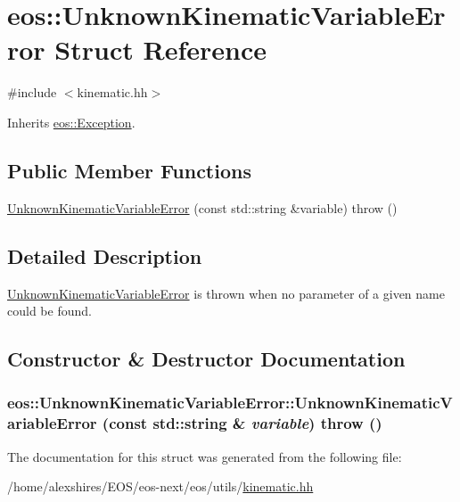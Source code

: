 \hypertarget{structeos_1_1UnknownKinematicVariableError}{
\section{eos::UnknownKinematicVariableError Struct Reference}
\label{structeos_1_1UnknownKinematicVariableError}
}


{\ttfamily \#include $<$kinematic.hh$>$}

Inherits \hyperlink{classeos_1_1Exception}{eos::Exception}.\subsection*{Public Member Functions}
\begin{DoxyCompactItemize}
\item 
\hyperlink{structeos_1_1UnknownKinematicVariableError_a6f06ee64bdae813e463662c63f09d578}{UnknownKinematicVariableError} (const std::string \&variable)  throw ()
\end{DoxyCompactItemize}


\subsection{Detailed Description}
\hyperlink{structeos_1_1UnknownKinematicVariableError}{UnknownKinematicVariableError} is thrown when no parameter of a given name could be found. 

\subsection{Constructor \& Destructor Documentation}
\hypertarget{structeos_1_1UnknownKinematicVariableError_a6f06ee64bdae813e463662c63f09d578}{
\subsubsection[{UnknownKinematicVariableError}]{\setlength{\rightskip}{0pt plus 5cm}eos::UnknownKinematicVariableError::UnknownKinematicVariableError (const std::string \& {\em variable})  throw ()}}
\label{structeos_1_1UnknownKinematicVariableError_a6f06ee64bdae813e463662c63f09d578}


The documentation for this struct was generated from the following file:\begin{DoxyCompactItemize}
\item 
/home/alexshires/EOS/eos-\/next/eos/utils/\hyperlink{kinematic_8hh}{kinematic.hh}\end{DoxyCompactItemize}
